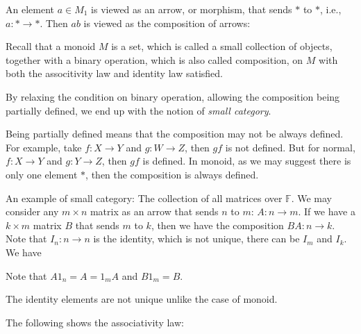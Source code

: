 \documentclass[
	11pt, %
	fleqn, %
	a4paper, %
]{LegrandOrangeBook}
\newcommand{\F}{\mathbb{F}} %
\begin{document}
An element $a \in M_1$ is viewed as an arrow, or morphism, that sends $*$ to $*$, i.e., $a : * \to *$. Then $ab$ is viewed as the composition of arrows:
\begin{center}
\end{center}

Recall that a monoid $M$ is a set, which is called a small collection of objects, together with a binary operation, which is also called composition, on $M$ with both the associtivity law and identity law satisfied. 

By relaxing the condition on binary operation, allowing the composition being partially defined, we end up with the notion of \emph{small category}.

Being partially defined means that the composition may not be always defined. For example, take $f : X \to Y$ and $g : W \to Z$, then $gf$ is not defined. But for normal, $f : X \to Y$ and $g : Y \to Z$, then $gf$ is defined. In monoid, as we may suggest there is only one element $*$, then the composition is always defined.

An example of small category: The collection of all matrices over $\F$. We may consider any $m \times n$ matrix as an arrow that sends $n$ to $m$: $A : n \to m$. If we have a $k \times m$ matrix $B$ that sends $m$ to $k$, then we have the composition $BA : n \to k$. Note that $I_n : n \to n$ is the identity, which is not unique, there can be $I_m$ and $I_k$. We have 
\begin{center}
\end{center}
Note that $A 1_n = A = 1_m A$ and $B 1_m = B$.
\begin{remark}
    The identity elements are not unique unlike the case of monoid.
\end{remark}

The following shows the associativity law:
\begin{center}
\end{center}
\end{document}
